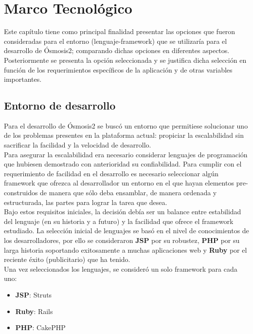\chapter{Marco Tecnológico}
Este capítulo tiene como principal finalidad presentar las opciones que fueron consideradas para el entorno (lenguaje-framework) que se utilizaría para el desarrollo de Ósmosis2; comparando dichas opciones en diferentes aspectos.
Posteriormente se presenta la opción seleccionada y se justifica dicha selección en función de los requerimientos específicos de la aplicación y de otras variables importantes.

\section{Entorno de desarrollo}
Para el desarrollo de Ósmosis2 se buscó un entorno que permitiese solucionar uno de los problemas presentes en la plataforma actual: propiciar la escalabilidad sin sacrificar la facilidad y la velocidad de desarrollo.\\

Para asegurar la escalabilidad era necesario considerar lenguajes de programación que hubiesen demostrado con anterioridad su confiabilidad. Para cumplir con el requerimiento de facilidad en el desarrollo es necesario seleccionar algún framework que ofrezca al desarrollador un entorno en el que hayan elementos pre-construidos de manera que sólo deba ensamblar, de manera ordenada y estructurada, las partes para lograr la tarea que desea.\\

Bajo estos requisitos iniciales, la decisión debía ser un balance entre estabilidad del lenguaje (en su historia y a futuro) y la facilidad que ofrece el framework estudiado. La selección inicial de lenguajes se basó en el nivel de conocimientos de los desarrolladores, por ello se consideraron \textbf{JSP} por su robustez, \textbf{PHP} por su larga historia soportando exitosamente a muchas aplicaciones web y \textbf{Ruby} por el reciente éxito (publicitario) que ha tenido.\\ 

Una vez seleccionados los lenguajes, se consideró un solo framework para cada uno:
\begin{itemize}
\item \textbf{JSP}: Struts
\item \textbf{Ruby}: Rails
\item \textbf{PHP}: CakePHP
\end{itemize}


